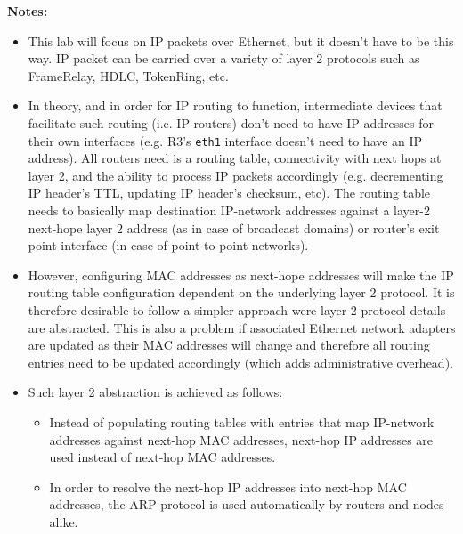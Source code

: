 \documentclass[pdftex,12pt,a4paper]{article}
\begin{document}
            \textbf{Notes:} 
            \begin{itemize}
                \item This lab will focus on IP packets over Ethernet, but it
                    doesn't have to be this way. IP packet can be carried over
                    a variety of layer 2 protocols such as FrameRelay, HDLC,
                    TokenRing, etc.
                \item In theory, and in order for IP routing to function,
                    intermediate devices that facilitate such routing (i.e. IP
                    routers) don't need to have IP addresses for their own
                    interfaces (e.g. R3's \texttt{eth1} interface doesn't need
                    to have an IP address). All routers need is a routing
                    table, connectivity with next hops at layer 2, and the
                    ability to process IP packets accordingly (e.g.
                    decrementing IP header's TTL, updating IP header's
                    checksum, etc). The routing table needs to basically map
                    destination IP-network addresses against a layer-2
                    next-hope layer 2 address (as in case of broadcast domains)
                    or router's exit point interface (in case of point-to-point
                    networks). 
                \item However, configuring MAC addresses as next-hope addresses
                    will make the IP routing table configuration dependent on
                    the underlying layer 2 protocol. It is therefore desirable
                    to follow a simpler approach were layer 2 protocol details
                    are abstracted. This is also a problem if associated
                    Ethernet network adapters are updated as their MAC
                    addresses will change and therefore all routing entries
                    need to be updated accordingly (which adds administrative
                    overhead).
                \item Such layer 2 abstraction is achieved as follows:
                    \begin{itemize}
                        \item Instead of populating routing tables with entries
                            that map IP-network addresses against next-hop MAC
                            addresses, next-hop IP addresses are used instead
                            of next-hop MAC addresses.
                        \item In order to resolve the next-hop IP addresses
                            into next-hop MAC addresses, the ARP protocol is
                            used automatically by routers and nodes alike.
                    \end{itemize}
            \end{itemize}
\end{document}
